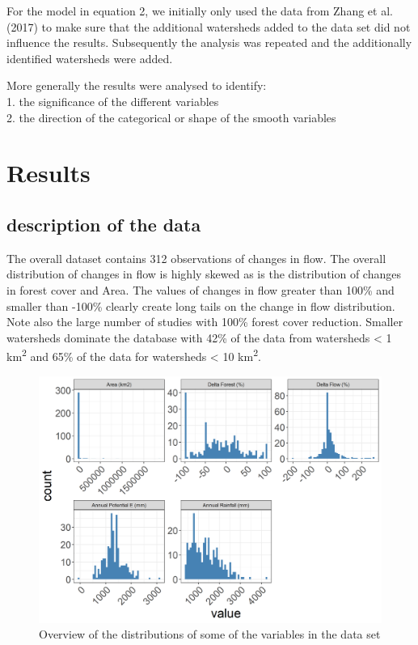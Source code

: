 \documentclass[]{elsarticle} %
\begin{document}
For the model in equation 2, we initially only used the data from Zhang
et al. (2017) to make sure that the additional watersheds added to the
data set did not influence the results. Subsequently the analysis was
repeated and the additionally identified watersheds were added.

More generally the results were analysed to identify:\\
1. the significance of the different variables\\
2. the direction of the categorical or shape of the smooth variables

\hypertarget{results}{%
\section{Results}\label{results}}

\hypertarget{description-of-the-data}{%
\subsection{description of the data}\label{description-of-the-data}}

The overall dataset contains 312 observations of changes in flow. The
overall distribution of changes in flow is highly skewed as is the
distribution of changes in forest cover and Area. The values of changes
in flow greater than 100\% and smaller than -100\% clearly create long
tails on the change in flow distribution. Note also the large number of
studies with 100\% forest cover reduction. Smaller watersheds dominate
the database with 42\% of the data from watersheds \textless{} 1
km\textsuperscript{2} and 65\% of the data for watersheds \textless{} 10
km\textsuperscript{2}.

\begin{figure}
\includegraphics[width=0.9\linewidth]{DataExploration} \caption{Overview of the distributions of some of the variables in the data set}\label{fig:data_graphs}
\end{figure}
\end{document}
